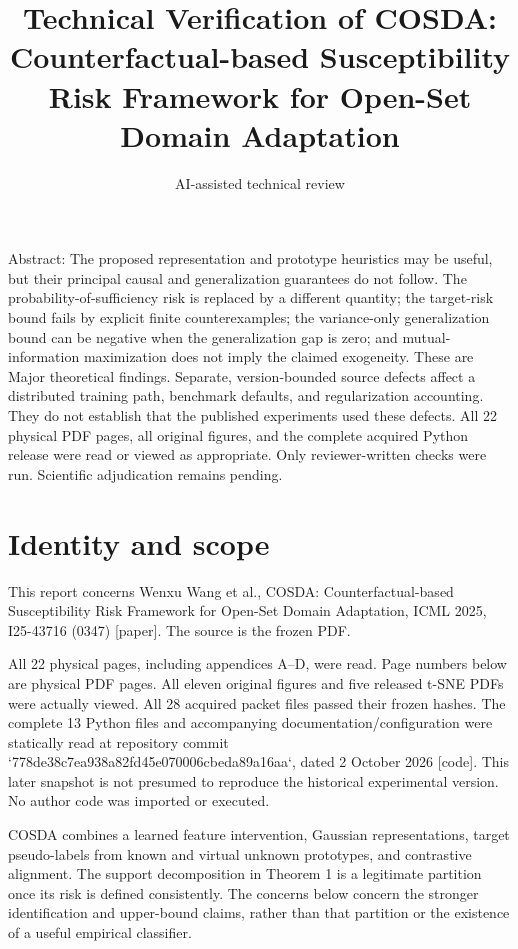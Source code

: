 \documentclass[10pt]{article}
\title{Technical Verification of COSDA: Counterfactual-based Susceptibility Risk Framework for Open-Set Domain Adaptation}
\author{AI-assisted technical review}
\date{}
\begin{document}
\maketitle
Abstract: The proposed representation and prototype heuristics may be useful, but their principal causal and generalization guarantees do not follow. The probability-of-sufficiency risk is replaced by a different quantity; the target-risk bound fails by explicit finite counterexamples; the variance-only generalization bound can be negative when the generalization gap is zero; and mutual-information maximization does not imply the claimed exogeneity. These are Major theoretical findings. Separate, version-bounded source defects affect a distributed training path, benchmark defaults, and regularization accounting. They do not establish that the published experiments used these defects. All 22 physical PDF pages, all original figures, and the complete acquired Python release were read or viewed as appropriate. Only reviewer-written checks were run. Scientific adjudication remains pending.\par
\section*{Identity and scope}
This report concerns Wenxu Wang et al., COSDA: Counterfactual-based Susceptibility Risk Framework for Open-Set Domain Adaptation, ICML 2025, I25-43716 (0347) [paper]. The source is the frozen PDF.\par
All 22 physical pages, including appendices A–D, were read. Page numbers below are physical PDF pages. All eleven original figures and five released t-SNE PDFs were actually viewed. All 28 acquired packet files passed their frozen hashes. The complete 13 Python files and accompanying documentation/configuration were statically read at repository commit `778de38c7ea938a82fd45e070006cbeda89a16aa`, dated 2 October 2026 [code]. This later snapshot is not presumed to reproduce the historical experimental version. No author code was imported or executed.\par
COSDA combines a learned feature intervention, Gaussian representations, target pseudo-labels from known and virtual unknown prototypes, and contrastive alignment. The support decomposition in Theorem 1 is a legitimate partition once its risk is defined consistently. The concerns below concern the stronger identification and upper-bound claims, rather than that partition or the existence of a useful empirical classifier.\par
\end{document}
